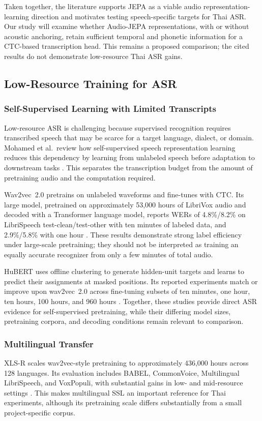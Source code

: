 \documentclass[conference]{IEEEtran}
\begin{document}
Taken together, the literature supports JEPA as a viable audio representation-learning direction and motivates testing speech-specific targets for Thai ASR. Our study will examine whether Audio-JEPA representations, with or without acoustic anchoring, retain sufficient temporal and phonetic information for a CTC-based transcription head. This remains a proposed comparison; the cited results do not demonstrate low-resource Thai ASR gains.

\subsection{Low-Resource Training for ASR}

\subsubsection{Self-Supervised Learning with Limited Transcripts}
Low-resource ASR is challenging because supervised recognition requires transcribed speech that may be scarce for a target language, dialect, or domain. Mohamed et al.\ review how self-supervised speech representation learning reduces this dependency by learning from unlabeled speech before adaptation to downstream tasks \cite{mohamed2022sslreview}. This separates the transcription budget from the amount of pretraining audio and the computation required.

Wav2vec~2.0 pretrains on unlabeled waveforms and fine-tunes with CTC. Its large model, pretrained on approximately 53,000 hours of LibriVox audio and decoded with a Transformer language model, reports WERs of 4.8\%/8.2\% on LibriSpeech test-clean/test-other with ten minutes of labeled data, and 2.9\%/5.8\% with one hour \cite{baevski2020wav2vec2}. These results demonstrate strong label efficiency under large-scale pretraining; they should not be interpreted as training an equally accurate recognizer from only a few minutes of total audio.

HuBERT uses offline clustering to generate hidden-unit targets and learns to predict their assignments at masked positions. Its reported experiments match or improve upon wav2vec~2.0 across fine-tuning subsets of ten minutes, one hour, ten hours, 100 hours, and 960 hours \cite{hsu2021hubert}. Together, these studies provide direct ASR evidence for self-supervised pretraining, while their differing model sizes, pretraining corpora, and decoding conditions remain relevant to comparison.

\subsubsection{Multilingual Transfer}
XLS-R scales wav2vec-style pretraining to approximately 436,000 hours across 128 languages. Its evaluation includes BABEL, CommonVoice, Multilingual LibriSpeech, and VoxPopuli, with substantial gains in low- and mid-resource settings \cite{babu2022xlsr}. This makes multilingual SSL an important reference for Thai experiments, although its pretraining scale differs substantially from a small project-specific corpus.
\end{document}
